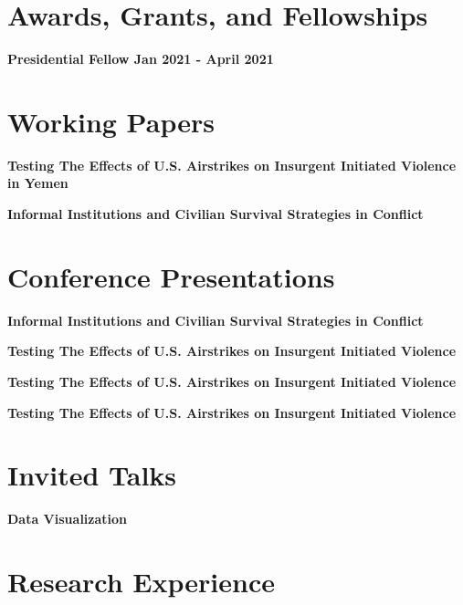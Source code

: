 \documentclass[margin]{res}
\newcommand{\fullhrulefill}{%
  \hspace*{-\sectionwidth}\hrulefill%
  }
\begin{document}
\begin{resume}
\section{Awards, Grants, and Fellowships}
\textbf {Presidential Fellow \hfill {Jan 2021 - April 2021 } \\ }

\fullhrulefill
\section{Working Papers}
\textbf {Testing The Effects of U.S. Airstrikes on Insurgent Initiated Violence in Yemen}

\textbf {Informal Institutions and Civilian Survival Strategies in Conflict}

\fullhrulefill
\section {Conference Presentations}


\textbf {Informal Institutions and Civilian Survival Strategies in Conflict \hfill  \\ }

\textbf {Testing The Effects of U.S. Airstrikes on Insurgent Initiated Violence \hfill  \\ }

\textbf {Testing The Effects of U.S. Airstrikes on Insurgent Initiated Violence \hfill  \\ }

\textbf {Testing The Effects of U.S. Airstrikes on Insurgent Initiated Violence \hfill \\ }

\fullhrulefill
\section{Invited Talks}

\textbf{Data Visualization \hfill \\}

\fullhrulefill
\section{ Research Experience}


\end{resume}
\end{document}
